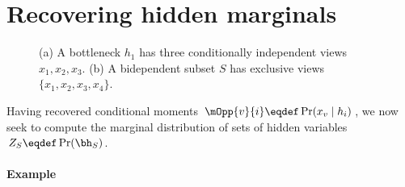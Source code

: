 \section{Recovering hidden marginals}
\label{sec:hiddenMarginals}

\begin{figure}
  \centering
  \hspace{2em}

  \caption{
    \label{fig:bottleneckExclusiveViews}
  (a) A bottleneck $h_1$ has three conditionally independent views $x_1,x_2,x_3$.
  (b) A bidependent subset $S$ has exclusive views $\{x_1,x_2,x_3,x_4\}$.
  }
\end{figure}

Having recovered conditional moments $\mOpp{v}{i} \eqdef \Pr(x_v \mid h_i)$,
we now seek to compute the marginal distribution of sets of hidden variables
$Z_S \eqdef \Pr(\bh_S)$.


\paragraph{Example}

